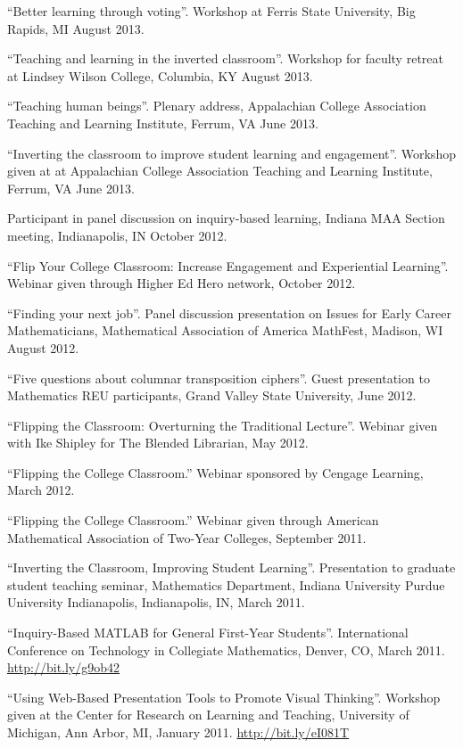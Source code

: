 \documentclass[letterpaper]{article}
\renewenvironment{itemize}{
  \begin{list}{}{
    \setlength{\leftmargin}{1.5em}
	\setlength{\itemsep}{0in}
  }
}{
  \end{list}
}
\begin{document}
\begin{itemize}
	\item ``Better learning through voting''. Workshop at Ferris State University, Big Rapids, MI August 2013.
	\item ``Teaching and learning in the inverted classroom''. Workshop for faculty retreat at Lindsey Wilson College, Columbia, KY August 2013.
	\item ``Teaching human beings''. Plenary address, Appalachian College Association Teaching and Learning Institute, Ferrum, VA June 2013.
	\item ``Inverting the classroom to improve student learning and engagement''. Workshop given at at Appalachian College Association Teaching and Learning Institute, Ferrum, VA June 2013.
	\item Participant in panel discussion on inquiry-based learning, Indiana MAA Section meeting, Indianapolis, IN October 2012.
	\item ``Flip Your College Classroom: Increase Engagement and Experiential Learning''. Webinar given through Higher Ed Hero network, October 2012.
	\item ``Finding your next job''. Panel discussion presentation on Issues for Early Career Mathematicians, Mathematical Association of America MathFest, Madison, WI August 2012.
	\item ``Five questions about columnar transposition ciphers''. Guest presentation to Mathematics REU participants, Grand Valley State University, June 2012.
	\item ``Flipping the Classroom: Overturning the Traditional Lecture''. Webinar given with Ike Shipley for The Blended Librarian, May 2012.
	\item ``Flipping the College Classroom.'' Webinar sponsored by Cengage Learning, March 2012.
	\item ``Flipping the College Classroom.'' Webinar given through American Mathematical Association of Two-Year Colleges, September 2011.
	\item  ``Inverting the Classroom, Improving Student Learning''. Presentation to graduate student teaching seminar, Mathematics Department, Indiana University Purdue University Indianapolis, Indianapolis, IN, March 2011.
	\item ``Inquiry-Based MATLAB for General First-Year Students''. International Conference on Technology in Collegiate Mathematics, Denver, CO, March 2011. \url{http://bit.ly/g9ob42}
	\item ``Using Web-Based Presentation Tools to Promote Visual Thinking''. Workshop given at the Center for Research on Learning and Teaching, University of Michigan, Ann Arbor, MI, January 2011. \url{http://bit.ly/eI081T}

\end{itemize}
\end{document}
